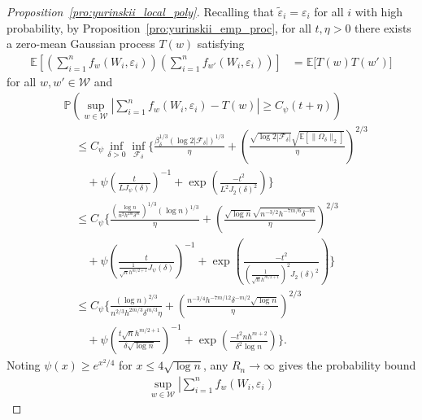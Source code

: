 \documentclass[11pt,lof]{puthesis}
\renewcommand{\P}{\ensuremath{\mathbb{P}}}
\newcommand{\E}{\ensuremath{\mathbb{E}}}
\newcommand{\cF}{\ensuremath{\mathcal{F}}}
\newcommand{\cW}{\ensuremath{\mathcal{W}}}
\theoremstyle{break}
\theoremstyle{proof}
\newtheorem{proof}{Proof}
\begin{document}
\begin{proof}[Proposition~\ref{pro:yurinskii_local_poly}]
  Recalling that
  $\tilde\varepsilon_i = \varepsilon_i$
  for all $i$ with high probability,
  by Proposition~\ref{pro:yurinskii_emp_proc},
  for all $t, \eta > 0$ there exists a
  zero-mean Gaussian process $T(w)$ satisfying
  \begin{align*}
    \E\left[
      \left(\sum_{i=1}^n f_w(W_i, \varepsilon_i)\right)
      \left(\sum_{i=1}^n f_{w'}(W_i, \varepsilon_i)\right)
    \right]
    &= \E\big[ T(w) T(w')
    \big]
  \end{align*}
  for all $w, w' \in \cW$ and
  \begin{align*}
    &\P\left(
      \sup_{w \in \cW}
      \left| \sum_{i=1}^n f_{w}(W_i, \varepsilon_i)
      - T(w) \right|
      \geq C_\psi(t + \eta)
    \right) \\
    &\quad\leq
    C_\psi
    \inf_{\delta > 0}
    \inf_{\cF_\delta}
    \Bigg\{
      \frac{\beta_\delta^{1/3} (\log 2 |\cF_\delta|)^{1/3}}{\eta }
      + \left(\frac{\sqrt{\log 2 |\cF_\delta|}
      \sqrt{\E\left[\|\Omega_\delta\|_2\right]}}{\eta }\right)^{2/3} \\
      &\qquad+
      \psi\left(\frac{t}{L J_\psi(\delta)}\right)^{-1}
      + \exp\left(\frac{-t^2}{L^2 J_2(\delta)^2}\right)
    \Bigg\} \\
    &\quad\leq
    C_\psi
    \Bigg\{
      \frac{
        \left(\frac{\log n} {n^2 h^{2m} \delta^{m}} \right)^{1/3}
      (\log n)^{1/3}}{\eta }
      + \left(\frac{\sqrt{\log n}
          \sqrt{n^{-3/2} h^{-7m/6} \delta^{-m}}
      }{\eta }\right)^{2/3} \\
      &\qquad+
      \psi\left(\frac{t}{\frac{1}{\sqrt{n} h^{m/2+1}}
      J_\psi(\delta)}\right)^{-1}
      + \exp\left(\frac{-t^2}{
          \left( \frac{1}{\sqrt{n} h^{m/2+1}} \right)^2
      J_2(\delta)^2}\right)
    \Bigg\} \\
    &\quad\leq
    C_\psi
    \Bigg\{
      \frac{
      (\log n)^{2/3}}{n^{2/3} h^{2m/3} \delta^{m/3} \eta}
      + \left(\frac{
        n^{-3/4} h^{-7m/12} \delta^{-m/2} \sqrt{\log n}}
      {\eta }\right)^{2/3} \\
      &\qquad+
      \psi\left(\frac{t\sqrt{n} h^{m/2+1}}
      {\delta \sqrt{\log n}}\right)^{-1}
      + \exp\left(\frac{-t^2n h^{m+2}}
      {\delta^2 \log n}\right)
    \Bigg\}.
  \end{align*}
  Noting $\psi(x) \geq e^{x^2/4}$ for $x \leq 4 \sqrt{\log n}$,
  any $R_n \to \infty$ gives the probability bound
  \begin{align*}
    \sup_{w \in \cW}
    \left| \sum_{i=1}^n f_{w}(W_i, \varepsilon_i)

\end{align*}
\end{proof}
\end{document}
